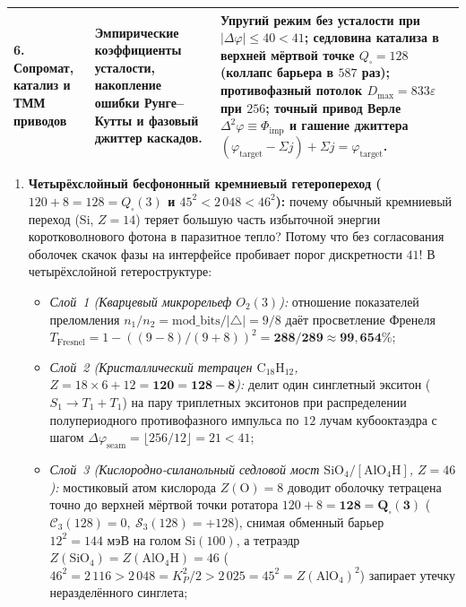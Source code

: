 \begin{table}[htbp]
\begin{tabular}{@{}p{}p{}p{}@{}}
\addlinespace[3pt]
\textbf{6. Сопромат, катализ и ТММ приводов} &
Эмпирические коэффициенты усталости, накопление ошибки Рунге--Кутты и фазовый джиттер каскадов. &
Упругий режим без усталости при $|\Delta\varphi|\le 40 < 41$; седловина катализа в верхней мёртвой точке $Q_\square=128$ (коллапс барьера в $587$ раз); противофазный потолок $D_{\max}=833\varepsilon$ при $256$; точный привод Верле $\Delta^2\varphi\equiv\Phi_{\mathrm{imp}}$ и гашение джиттера $(\varphi_{\mathrm{target}}-\Sigma j)+\Sigma j = \varphi_{\mathrm{target}}$. \\
\bottomrule
\end{tabular}
\end{table}

\begin{enumerate}[label=\textbf{\arabic*.},leftmargin=*]
\item \textbf{Четырёхслойный бесфононный кремниевый гетеропереход ($120 + 8 = 128 = Q_\square(3)$ и $45^2 < 2\,048 < 46^2$):}
  почему обычный кремниевый переход ($\mathrm{Si}$, $Z=14$) теряет большую часть избыточной энергии коротковолнового фотона в паразитное тепло? Потому что без согласования оболочек скачок фазы на интерфейсе пробивает порог дискретности $41$! В четырёхслойной гетероструктуре:
  \begin{itemize}[noitemsep]
  \item \emph{Слой~1 (Кварцевый микрорельеф $O_2(3)$):} отношение показателей преломления $n_1/n_2 = \mathrm{mod\_bits}/|{\triangle}| = 9/8$ даёт просветление Френеля $T_{\mathrm{Fresnel}} = 1 - ((9-8)/(9+8))^2 = \mathbf{288/289\approx 99{,}654\%}$;
  \item \emph{Слой~2 (Кристаллический тетрацен $\mathrm{C_{18}H_{12}}$, $Z = 18\times 6 + 12 = \mathbf{120 = 128 - 8}$):} делит один синглетный экситон ($S_1 \to T_1 + T_1$) на пару триплетных экситонов при распределении полупериодного противофазного импульса по $12$ лучам кубооктаэдра с шагом $\Delta\varphi_{\mathrm{seam}} = \lfloor 256/12\rfloor = 21 < 41$;
  \item \emph{Слой~3 (Кислородно-силанольный седловой мост $\mathrm{SiO_4}/[\mathrm{AlO_4H}]$, $Z = 46$):} мостиковый атом кислорода $Z(\mathrm{O}) = 8$ доводит оболочку тетрацена точно до верхней мёртвой точки ротатора $120 + 8 = \mathbf{128 = Q_\square(3)}$ ($\mathcal{C}_3(128)=0,\ \mathcal{S}_3(128)=+128$), снимая обменный барьер $12^2 = 144\text{ мэВ}$ на голом $\mathrm{Si}(100)$, а тетраэдр $Z(\mathrm{SiO_4}) = Z(\mathrm{AlO_4H}) = 46$ ($46^2 = 2\,116 > 2\,048 = K_P^2/2 > 2\,025 = 45^2 = Z(\mathrm{AlO_4})^2$) запирает утечку неразделённого синглета;

\end{itemize}
\end{enumerate}
